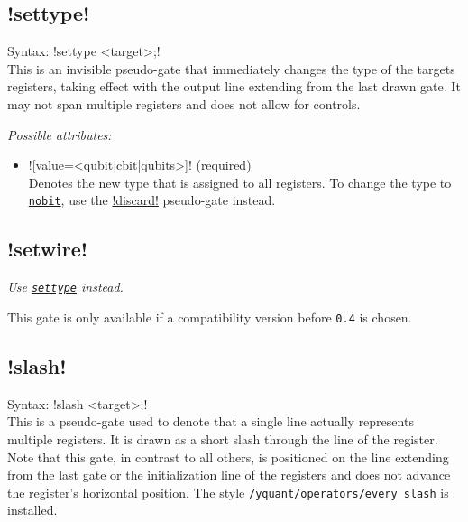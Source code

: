 \documentclass{scrartcl}
\def\gate#1{\hyperref[gate:#1]{\texttt{#1}}}
\def\style#1{\hyperref[style:#1]{\texttt{#1}}}
\begin{document}
      \subsection[\texorpdfstring{\yquant!settype!}{settype}]{\yquant!settype!}\label{gate:settype}
         Syntax: \yquant!settype <target>;! \\
         This is an invisible pseudo\hyp gate that immediately changes the type of the targets registers, taking effect with the output line extending from the last drawn gate.
         It may not span multiple registers and does not allow for controls.

         \emph{Possible attributes:}
         \begin{itemize}
            \item \yquant![value=<qubit|cbit|qubits>]! (required) \\
               Denotes the new type that is assigned to all registers.
               To change the type to \gate{nobit}, use the \hyperref[gate:discard]{\yquant!discard!} pseudo\hyp gate instead.
         \end{itemize}

      \subsection[\texorpdfstring{\yquant!setwire!}{setwire}]{\yquant!setwire!}\label{gate:setwire}
         \emph{Use \gate{settype} instead.}

         This gate is only available if a compatibility version before \texttt{0.4} is chosen.

      \subsection{\texorpdfstring{\yquant!slash!}{slash}}\label{gate:slash}
         Syntax: \yquant!slash <target>;! \\
         This is a pseudo\hyp gate used to denote that a single line actually represents multiple registers.
         It is drawn as a short slash through the line of the register.
         Note that this gate, in contrast to all others, is positioned on the line extending from the last gate or the initialization line of the registers and does not advance the register's horizontal position.
         The style \style{/yquant/operators/every slash} is installed.
\end{document}
